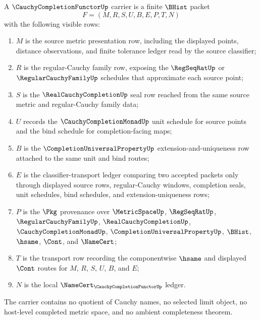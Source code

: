 \begin{definition}
\label{def:cauchycompletionfunctor-carrier}
A $\CauchyCompletionFunctorUp$ carrier is a finite $\BHist$ packet
$$
F=(M,R,S,U,B,E,P,T,N)
$$
with the following visible rows:
\begin{enumerate}
\item $M$ is the source metric presentation row, including the displayed points, distance observations, and finite tolerance ledger read by the source classifier;
\item $R$ is the regular-Cauchy family row, exposing the $\RegSeqRatUp$ or $\RegularCauchyFamilyUp$ schedules that approximate each source point;
\item $S$ is the $\RealCauchyCompletionUp$ seal row reached from the same source metric and regular-Cauchy family data;
\item $U$ records the $\CauchyCompletionMonadUp$ unit schedule for source points and the bind schedule for completion-facing maps;
\item $B$ is the $\CompletionUniversalPropertyUp$ extension-and-uniqueness row attached to the same unit and bind routes;
\item $E$ is the classifier-transport ledger comparing two accepted packets only through displayed source rows, regular-Cauchy windows, completion seals, unit schedules, bind schedules, and extension-uniqueness rows;
\item $P$ is the $\Pkg$ provenance over $\MetricSpaceUp$, $\RegSeqRatUp$, $\RegularCauchyFamilyUp$, $\RealCauchyCompletionUp$, $\CauchyCompletionMonadUp$, $\CompletionUniversalPropertyUp$, $\BHist$, $\hsame$, $\Cont$, and $\NameCert$;
\item $T$ is the transport row recording the componentwise $\hsame$ and displayed $\Cont$ routes for $M$, $R$, $S$, $U$, $B$, and $E$;
\item $N$ is the local $\NameCert_{\CauchyCompletionFunctorUp}$ ledger.
\end{enumerate}
The carrier contains no quotient of Cauchy names, no selected limit object, no host-level completed metric space, and no ambient completeness theorem.
\end{definition}

